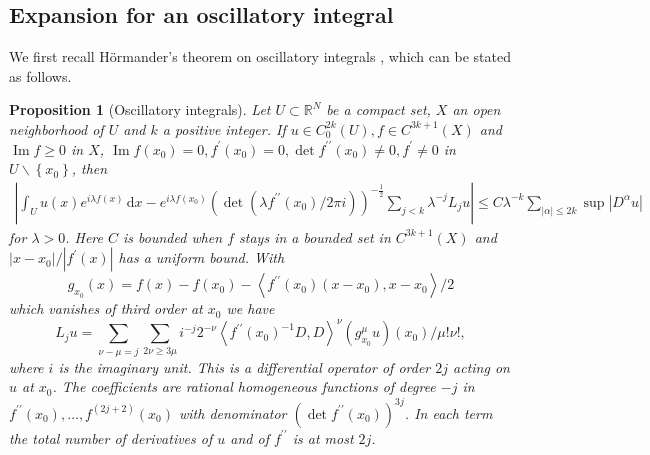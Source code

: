 \documentclass[12pt]{article}
\numberwithin{equation}{section}
\newtheorem{proposition}[theorem]{Proposition}
\numberwithin{equation}{section}
\begin{document}
\subsection{Expansion for an oscillatory integral}
We first recall H\"{o}rmander's theorem on oscillatory integrals \cite[Theorem 7.7.5]{Hormander}, which can be stated as follows.
\begin{proposition}[Oscillatory integrals]\label{Proposition 2.1}
Let $U\subset \mathbb{R}^{N}$ be a compact set, $X$ an open neighborhood of $U$ and $k$ a positive integer. If $u \in C_{0}^{2 k}(U), f \in C^{3 k+1}(X)$ and $\operatorname{Im} f \geq 0$ in $X$, $\operatorname{Im} f\left(x_{0}\right)=0, f^{\prime}\left(x_{0}\right)=0, \operatorname{det} f^{\prime \prime}\left(x_{0}\right) \neq 0, f^{\prime} \neq 0$ in $U\backslash\left\{x_{0}\right\}$, then
\begin{equation*}
  \begin{array}{l}
\left|\int_U u(x) e^{i\lambda f(x)} \,\text{d} x-e^{i\lambda f\left(x_{0}\right)}\left(\operatorname{det}\left(\lambda f^{\prime \prime}\left(x_{0}\right) / 2 \pi i\right)\right)^{-\frac{1}{2}}\sum\limits_{j<k} \lambda^{-j} L_{j} u\right| \leq C\lambda^{-k} \sum\limits_{|\alpha| \leq 2 k} \sup \left|D^{\alpha} u\right|
\end{array}
\end{equation*}
\emph{for $\lambda>0$.
Here $C$ is bounded when $f$ stays in a bounded set in $C^{3 k+1}(X)$ and $\left|x-x_{0}\right| /\left|f^{\prime}(x)\right|$ has a uniform bound. With}
\begin{equation*}
  g_{x_{0}}(x)=f(x)-f\left(x_{0}\right)-\left\langle f^{\prime \prime}\left(x_{0}\right)\left(x-x_{0}\right), x-x_{0}\right\rangle / 2
\end{equation*}
\emph{which vanishes of third order at $x_{0}$ we have}
\begin{equation*}
L_{j} u=\sum_{\nu-\mu=j} \sum_{2\nu \geq 3 \mu} i^{-j} 2^{-\nu}\left\langle f^{\prime \prime}\left(x_{0}\right)^{-1} D, D\right\rangle^{\nu}\left(g_{x_{0}}^{\mu} u\right)\left(x_{0}\right) / \mu!\nu!,
\end{equation*}
where $i$ is the imaginary unit. This is a differential operator of order $2j$ acting on $u$ at $x_{0}$.
The coefficients are rational homogeneous functions of degree $-j$ in $f^{\prime \prime}\left(x_{0}\right), \ldots, f^{(2 j+2)}\left(x_{0}\right)$ with denominator $\left(\operatorname{det} f^{\prime \prime}\left(x_{0}\right)\right)^{3 j}$.
In each term the total number of derivatives of $u$ and of $f^{\prime \prime}$ is at most $2j$.
\end{proposition}
\end{document}
